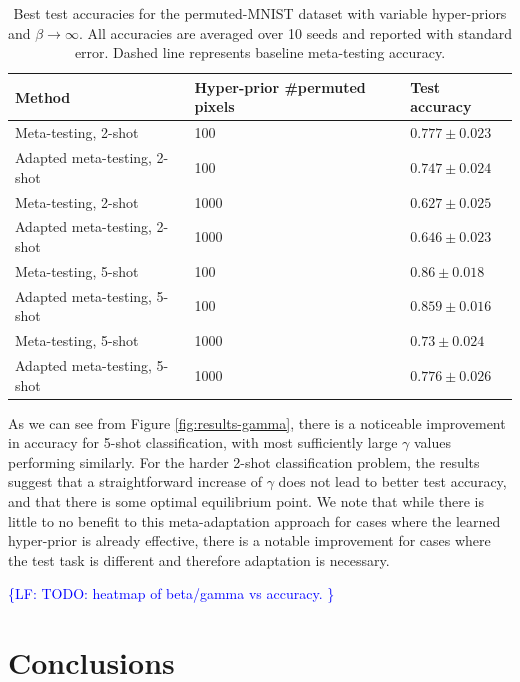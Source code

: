 \documentclass{article}
\theoremstyle{definition}
\newcommand{\LF}[1]{\textcolor{blue}{\{LF: #1\}}}
\begin{document}
\begin{table}	
	
	\centering
	\begin{tabular}{lll}
		\toprule
		Method   & Hyper-prior \#permuted pixels  & Test accuracy   \\
		\midrule
		Meta-testing, 2-shot & 100   & $0.777\pm 0.023 $      \\
		Adapted meta-testing, 2-shot & 100   & $0.747\pm 0.024$      \\
		\midrule
		Meta-testing, 2-shot & 1000   & $0.627\pm 0.025 $      \\
		Adapted meta-testing, 2-shot & 1000   & $0.646\pm 0.023$      \\
		\midrule
		Meta-testing, 5-shot & 100   & $0.86\pm 0.018$      \\
		Adapted meta-testing, 5-shot & 100   & $0.859\pm 0.016$      \\
		\midrule
		Meta-testing, 5-shot & 1000   & $0.73\pm 0.024$      \\
		Adapted meta-testing, 5-shot & 1000   & $0.776\pm 0.026$      \\
		\bottomrule
	\end{tabular}
	\caption{Best test accuracies for the permuted-MNIST dataset with variable hyper-priors and $\beta\rightarrow \infty$. All accuracies are averaged over 10 seeds and reported with standard error. Dashed line represents baseline meta-testing accuracy.}
	\label{table:gamma}
\end{table}


As we can see from Figure \ref{fig:results-gamma}, there is a noticeable improvement in accuracy for 5-shot classification, with most sufficiently large $\gamma$ values performing similarly. For the harder 2-shot classification problem, the results suggest that a straightforward increase of $\gamma$ does not lead to better test accuracy, and that there is some optimal equilibrium point. We note that while there is little to no benefit to this meta-adaptation approach for cases where the learned hyper-prior is already effective, there is a notable improvement for cases where the test task is different and therefore adaptation is necessary.


\LF{TODO: heatmap of beta/gamma vs accuracy. }

\section{Conclusions}
\end{document}
